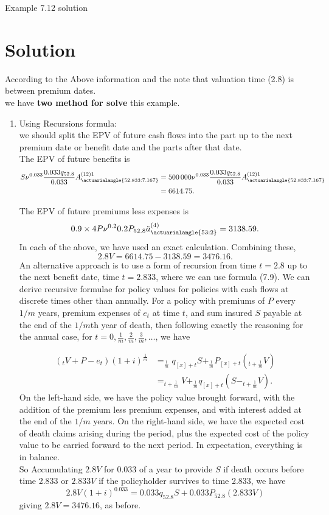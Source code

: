	\begin{solve}{}{Example 7.12 solution}
		\section*{Solution}
		According to the Above information and the note that valuation time (2.8) is between premium dates.\\
		
		we have \textbf{two method for solve} this example.
	\begin{enumerate}
		\item Using Recursions formula:\\
		we should split the EPV of future cash flows into the part up to the next premium date or benefit date and the parts
		after that date.\\
		The EPV of future benefits is 
		\begin{align*} S \nu^{0.033} \frac{0.033 q_{52.8}}{0.033} A_{\actuarialangle{52.833:7.167}}^{(12) 1} &= 500\,000 \nu^{0.033} \frac{0.033 q_{52.8}}{0.033} A_{\actuarialangle{52.833:7.167}}^{(12) 1} \\ &= 6614.75. 
		\end{align*}
		
		The EPV of future premiums less expenses is \[ 0.9 \times 4 P \nu^{0.2} 0.2 P_{52.8} \ddot{a}_{\actuarialangle{53:2}}^{(4)} = 3138.59.\] In each of the above, we have used an exact calculation. Combining these, \[ 2.8 V = 6614.75 - 3138.59 = 3476.16. \] An alternative approach is to use a form of recursion from time \( t = 2.8 \) up to the next benefit date, time \( t = 2.833 \), where we can use formula (7.9). 
		We can derive recursive formulae for policy values for policies with cash flows at discrete times other than annually. For a policy with premiums of \(P\) every \(1/m\) years, premium expenses of \(e_t\) at time \(t\), and sum insured \(S\) payable at the end of the \(1/m\)th year of death, then following exactly the reasoning for the annual case, for \(t = 0, \frac{1}{m}, \frac{2}{m}, \frac{3}{m}, \ldots\), we have 
		
		\begin{align*}
			\left(_tV + P - e_t\right) (1 + i)^{\frac{1}{m}} &= _\frac{1}{m} q_{[x]+t} S + _\frac{1}{m}P_{[x]+t} \left(_{t + \frac{1}{m}}V\right) \\
			&= _{t +\frac{1}{m}}V + _{\frac{1}{m}}q_{[x]+t} \left(S - _{t + \frac{1}{m} }V\right).
		\end{align*}
		On the left-hand side, we have the policy value brought forward, with the addition of the premium less premium expenses, and with interest added at the end of the \(1/m\) years. On the right-hand side, we have the expected cost of death claims arising during the period, plus the expected cost of the policy value to be carried forward to the next period. In expectation, everything is in balance.\\
		So Accumulating \( 2.8 V \) for 0.033 of a year to provide \( S \) if death occurs before time 2.833 or \( 2.833 V \) if the policyholder survives to time 2.833, we have \[ 2.8 V (1 + i)^{0.033} = 0.033 q_{52.8} S + 0.033 P_{52.8} (2.833 V) \] giving \( 2.8 V = 3476.16 \), as before.
	\end{enumerate}
		

\end{solve}
